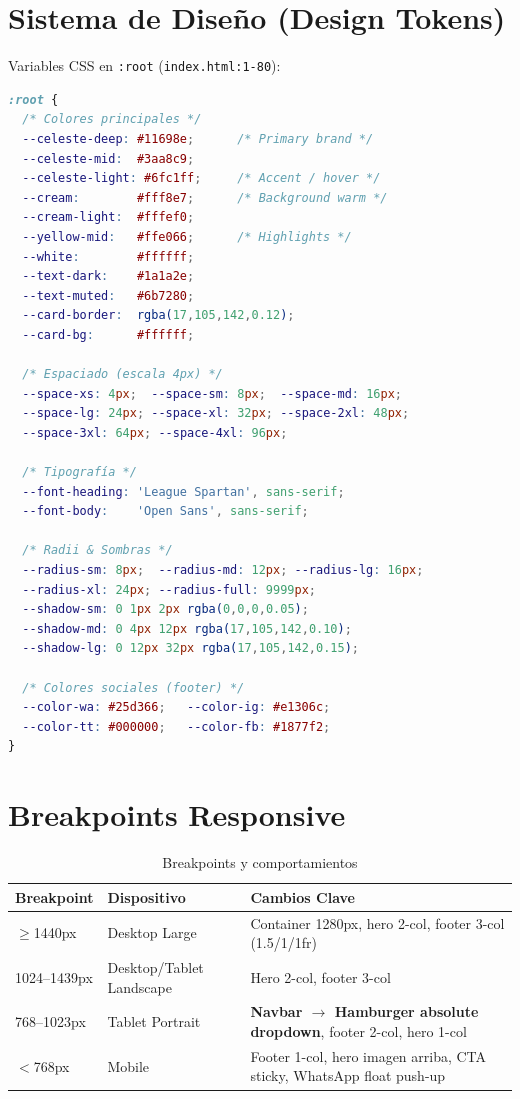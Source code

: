 \documentclass[12pt,a4paper,spanish]{report}
\begin{document}
\section{Sistema de Diseño (Design Tokens)}
Variables CSS en \texttt{:root} (\texttt{index.html:1-80}):

\begin{lstlisting}[language=CSS, caption={Design Tokens — Colores y Espaciado}]
:root {
  /* Colores principales */
  --celeste-deep: #11698e;      /* Primary brand */
  --celeste-mid:  #3aa8c9;
  --celeste-light: #6fc1ff;     /* Accent / hover */
  --cream:        #fff8e7;      /* Background warm */
  --cream-light:  #fffef0;
  --yellow-mid:   #ffe066;      /* Highlights */
  --white:        #ffffff;
  --text-dark:    #1a1a2e;
  --text-muted:   #6b7280;
  --card-border:  rgba(17,105,142,0.12);
  --card-bg:      #ffffff;

  /* Espaciado (escala 4px) */
  --space-xs: 4px;  --space-sm: 8px;  --space-md: 16px;
  --space-lg: 24px; --space-xl: 32px; --space-2xl: 48px;
  --space-3xl: 64px; --space-4xl: 96px;

  /* Tipografía */
  --font-heading: 'League Spartan', sans-serif;
  --font-body:    'Open Sans', sans-serif;

  /* Radii & Sombras */
  --radius-sm: 8px;  --radius-md: 12px; --radius-lg: 16px;
  --radius-xl: 24px; --radius-full: 9999px;
  --shadow-sm: 0 1px 2px rgba(0,0,0,0.05);
  --shadow-md: 0 4px 12px rgba(17,105,142,0.10);
  --shadow-lg: 0 12px 32px rgba(17,105,142,0.15);

  /* Colores sociales (footer) */
  --color-wa: #25d366;   --color-ig: #e1306c;
  --color-tt: #000000;   --color-fb: #1877f2;
}
\end{lstlisting}

\section{Breakpoints Responsive}
\begin{table}[H]
    \centering
    \caption{Breakpoints y comportamientos}
    \label{tab:breakpoints}
    \begin{tabular}{llp{6cm}}
        \toprule
        \textbf{Breakpoint} & \textbf{Dispositivo} & \textbf{Cambios Clave} \\
        \midrule
        $\geq$1440px & Desktop Large & Container 1280px, hero 2-col, footer 3-col (1.5/1/1fr) \\
        1024--1439px & Desktop/Tablet Landscape & Hero 2-col, footer 3-col \\
        768--1023px & Tablet Portrait & \textbf{Navbar $\rightarrow$ Hamburger absolute dropdown}, footer 2-col, hero 1-col \\
        $<$768px & Mobile & Footer 1-col, hero imagen arriba, CTA sticky, WhatsApp float push-up \\
        \bottomrule
    \end{tabular}
\end{table}
\end{document}
